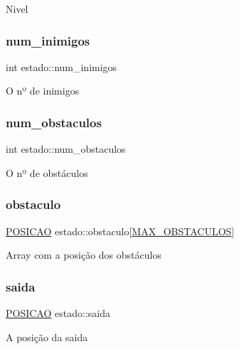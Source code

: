 Nivel \mbox{\label{structestado_a893967d30e93ad8c60dd13219df3f236}} 
\subsubsection{\texorpdfstring{num\+\_\+inimigos}{num\_inimigos}}
{\footnotesize\ttfamily int estado\+::num\+\_\+inimigos}

O nº de inimigos \mbox{\label{structestado_abf0a11515468f5843bb6e7c057e022f3}} 
\subsubsection{\texorpdfstring{num\+\_\+obstaculos}{num\_obstaculos}}
{\footnotesize\ttfamily int estado\+::num\+\_\+obstaculos}

O nº de obstáculos \mbox{\label{structestado_a970dc20c6687acb17c3f08c06edbed4f}} 
\subsubsection{\texorpdfstring{obstaculo}{obstaculo}}
{\footnotesize\ttfamily \hyperlink{estado_8h_a55b3f4b56938eeb8fa5e8f9c07baf1b0}{P\+O\+S\+I\+C\+AO} estado\+::obstaculo\mbox{[}\hyperlink{estado_8h_ac574e2817856ecc9a890d2d47cb9d783}{M\+A\+X\+\_\+\+O\+B\+S\+T\+A\+C\+U\+L\+OS}\mbox{]}}

Array com a posição dos obstáculos \mbox{\label{structestado_aca05b4bb64bbb53c0dab2dc61971ed91}} 
\subsubsection{\texorpdfstring{saida}{saida}}
{\footnotesize\ttfamily \hyperlink{estado_8h_a55b3f4b56938eeb8fa5e8f9c07baf1b0}{P\+O\+S\+I\+C\+AO} estado\+::saida}

A posição da saida \mbox{\label{structestado_a47e99ef4241dfe72d9d68244a68adb46}} 
